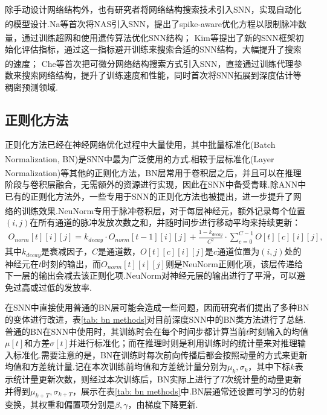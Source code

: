 \documentclass[10.5pt,compsoc,UTF8]{CjC}
\theoremstyle{mystyle}
\newcommand{\upcite}[1]{\textsuperscript{\cite{#1}}}
\begin{document}
\begin{multicols}{1}
除手动设计网络结构外，也有研究者将网络结构搜索技术引入SNN，实现自动化的模型设计.Na等\upcite{na2022autosnn}首次将NAS引入SNN，提出了spike-aware优化方程以限制脉冲数量，通过训练超网和使用遗传算法优化SNN结构；
Kim等\upcite{kim2022neural}提出了新的SNN框架初始化评估指标，通过这一指标避开训练来搜索合适的SNN结构，大幅提升了搜索的速度；
Che等\upcite{che2022differentiable}首次把可微分网络结构搜索方式引入SNN，直接通过训练代理参数来搜索网络结构，提升了训练速度和性能，同时首次将SNN拓展到深度估计等稠密预测领域.

\subsection{正则化方法}%
正则化方法已经在神经网络优化过程中大量使用，其中批量标准化(Batch Normalization, BN)\upcite{ioffe2015batch}是SNN中最为广泛使用的方式.相较于层标准化(Layer Normalization)\upcite{ba2016layer}等其他的正则化方法，BN层常用于卷积层之后，并且可以在推理阶段与卷积层融合，无需额外的资源进行实现，因此在SNN中备受青睐.除ANN中已有的正则化方法外，一些专用于SNN的正则化方法也被提出，进一步提升了网络的训练效果.NeuNorm\upcite{neunorm}专用于脉冲卷积层，对于每层神经元，额外记录每个位置$(i, j)$在所有通道的脉冲发放次数之和，并随时间步进行移动平均来持续更新：
\begin{eqnarray}
	O_{norm}[t][i][j] = k_{decay} \cdot O_{norm}[t-1][i][j] + \frac{1 - k_{decay}}{C^{2}} \cdot \sum_{c=0}^{C-1}O[t][c][i][j],
\end{eqnarray}
其中$k_{decay}$是衰减因子，$C$是通道数，$O[t][c][i][j]$是$c$通道位置为$(i, j)$处的神经元在$t$时刻的输出，而$O_{norm}[t][i][j]$则是NeuNorm正则化项，该层传递给下一层的输出会减去该正则化项.NeuNorm对神经元层的输出进行了平滑，可以避免过高或过低的发放率.

在SNN中直接使用普通的BN层可能会造成一些问题，因而研究者们提出了多种BN的变体进行改进，表\ref{tab: bn methods}对目前深度SNN中的BN类方法进行了总结.
普通的BN在SNN中使用时，其训练时会在每个时间步都计算当前$t$时刻输入的均值$\mu[t]$和方差$\sigma[t]$并进行标准化；而在推理时则是利用训练时的统计量来对推理输入标准化.需要注意的是，BN在训练时每次前向传播后都会按照动量的方式来更新均值和方差统计量.记在本次训练前均值和方差统计量分别为$\mu_{k},\sigma_{k}$，其中下标$k$表示统计量更新次数，则经过本次训练后，BN实际上进行了$T$次统计量的动量更新并得到$\mu_{k+T},\sigma_{k+T}$，展示在表\ref{tab: bn methods}中.BN层通常还设置可学习的仿射变换，其权重和偏置项分别是$\beta,\gamma$，由梯度下降更新.


\end{multicols}
\end{document}
